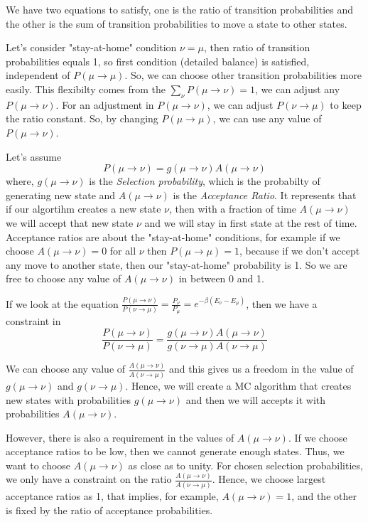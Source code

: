 \documentclass[12pt,fleqn]{report}
\begin{document}
We have two equations to satisfy, one is the ratio of transition probabilities and the other is the sum of transition probabilities to move a state to other states. 

Let's consider "stay-at-home" condition $\nu = \mu$, then ratio of transition probabilities equals 1, so first condition (detailed balance) is satisfied, independent of $P(\mu \rightarrow \mu)$. So, we can choose other transition probabilities more easily. This flexibilty comes from the $\sum\limits_{\nu} P(\mu \rightarrow \nu )  =1 $, we can adjust any $P(\mu \rightarrow \nu)$. For an adjustment in  $P(\mu \rightarrow \nu)$, we can adjust $P(\nu \rightarrow \mu)$ to keep the ratio constant. So, by changing  $P(\mu \rightarrow \mu)$, we can use any value of $P(\mu \rightarrow \nu)$. 

Let's assume $$P(\mu \rightarrow \nu) = g(\mu \rightarrow \nu) A(\mu \rightarrow \nu) $$ where, $g(\mu \rightarrow \nu)$ is the \textit{Selection probability}, which is the probabilty of generating new state and $A(\mu \rightarrow \nu)$ is the \textit{Acceptance Ratio}. It represents that if our algortihm creates a new state $\nu$, then with a fraction of time $A(\mu \rightarrow \nu)$ we will accept that new state $\nu$ and we will stay in first state at the rest of time. Acceptance ratios are about the "stay-at-home" conditions, for example if we choose $A(\mu \rightarrow \nu) = 0$ for all $\nu$ then $P(\mu \rightarrow \mu) = 1$, because if we don't accept any move to another state, then our "stay-at-home" probability is 1. So we are free to choose any value of $A(\mu \rightarrow \nu) $ in between 0 and 1.

If we look at the equation $\frac{P(\mu \rightarrow \nu)}{P(\nu \rightarrow \mu)} = \frac{P_\nu }{P_\mu } = e^ {-\beta (E_\nu - E_\mu)}$, then we have a constraint in $$\frac{P(\mu \rightarrow \nu)}{P(\nu \rightarrow \mu)} = \frac{g(\mu \rightarrow \nu)A(\mu \rightarrow \nu)}{g(\nu \rightarrow \mu)A(\nu \rightarrow \mu)} $$

We can choose any value of $\frac{A(\mu \rightarrow \nu)}{A(\nu \rightarrow \mu)}$ and this gives us a freedom in the value of $g(\mu \rightarrow \nu) $ and $g(\nu \rightarrow \mu) $. Hence, we will create a MC algorithm that creates new states with probabilities $g(\mu \rightarrow \nu) $ and then we will accepts it with probabilities $A(\mu \rightarrow \nu) $.

However, there is also a requirement in the values of $A(\mu \rightarrow \nu) $. If we choose acceptance ratios to be low, then we cannot generate enough states. Thus, we want to choose $A(\mu \rightarrow \nu) $ as close as to unity. For chosen selection probabilities, we only have a constraint on the ratio $\frac{A(\mu \rightarrow \nu)}{A(\nu \rightarrow \mu)}  $. Hence, we choose largest acceptance ratios as 1, that implies, for example,  $A(\mu \rightarrow \nu) = 1 $, and the other is fixed by the ratio of acceptance probabilities.
\end{document}
